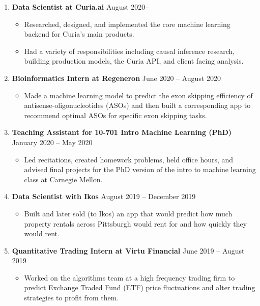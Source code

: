 \documentclass[letterpaper,11pt]{article}
\newcommand{\resitem}[1]{\item #1 \vspace{-2pt}}
\begin{document}
\vspace{-6pt}
\begin{enumerate}[leftmargin=10pt]
	\item[] \textbf{Data Scientist at \textcolor{myGreen}{Curia.ai}} \cftdotfill{\cftdotsep} August 2020--\\
	\vspace{-4pt}	
	\begin{itemize}
		\resitem{Researched, designed, and implemented the core machine learning backend for Curia's main products.}
		\resitem{Had a variety of responsibilities including causal inference research, building production models, the Curia API, and client facing analysis.}	
	\end{itemize}
	 
	\item[] \textbf{Bioinformatics Intern at \textcolor{myGreen}{Regeneron}} \cftdotfill{\cftdotsep} June 2020 -- August 2020\\
	\vspace{-4pt}	
	\begin{itemize}
		\resitem{Made a machine learning model to predict the exon skipping efficiency of antisense-oligonucleotides (ASOs) and then built a corresponding app to recommend optimal ASOs for specific exon skipping tasks.}	
	\end{itemize}

	\item[] \textbf{Teaching Assistant for \textcolor{myGreen}{10-701 Intro Machine Learning (PhD)}} \cftdotfill{\cftdotsep} January 2020 -- May 2020\\
	\vspace{-4pt}
	\begin{itemize}
		\resitem{Led recitations, created homework problems, held office hours, and advised final projects for the PhD version of the intro to machine learning class at Carnegie Mellon.}
	\end{itemize}

	\item[] \textbf{Data Scientist with \textcolor{myGreen}{Ikos}} \cftdotfill{\cftdotsep} August 2019 -- December 2019\\
	\vspace{-4pt}	
	\begin{itemize}
		\resitem{Built and later sold (to Ikos) an app that would predict how much property rentals across Pittsburgh would rent for and how quickly they would rent.}	
	\end{itemize}
	
	\item[] \textbf{Quantitative Trading Intern at \textcolor{myGreen}{Virtu Financial}} \cftdotfill{\cftdotsep} June 2019 -- August 2019\\
	\vspace{-4pt}
	\begin{itemize}
		\resitem{Worked on the algorithms team at a high frequency trading firm to predict Exchange Traded Fund (ETF) price fluctuations and alter trading strategies to profit from them.}
	\end{itemize}
\end{enumerate}
\end{document}
